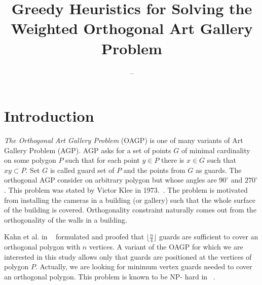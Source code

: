 \documentclass[runningheads,a4paper]{llncs}
\begin{document}
    \mainmatter  %

    \title{Greedy Heuristics for Solving the Weighted Orthogonal Art Gallery Problem}

    \author{--}

    \institute{%
    }

    \maketitle


    \section{Introduction}\label{sec:introduction}
     \emph{The Orthogonal Art Gallery Problem} (OAGP) is one of many variants of Art Gallery Problem (AGP). AGP asks for a set of points $G$ of minimal cardinality on some polygon $P$ such that for each point $y \in P$ there is $x \in G$ such that $xy \subset P$.  Set $G$ is called guard set of $P$ and the points from $G$ as guards. The orthogonal AGP consider on arbitrary polygon but whose angles are $90^{\circ}$ and $270^{\circ}$. This problem was stated by Victor  Klee in 1973.~\cite{o1987art}. The problem is motivated from installing the cameras in a building (or gallery) such that the whole surface of the building is covered. Orthogonality constraint naturally comes out from the orthogonality of the walls in a building.
     
     Kahn et al. in ~\cite{kahn1983traditional} formulated and proofed that 	$\lfloor \frac{n}{4} \rfloor$ guards are  sufficient to cover an orthogonal polygon with $n$ vertices.  A variant of the OAGP for which we are interested in this study allows only that guards are positioned at the vertices of polygon $P$. Actually, we are looking for minimum vertex guards needed to cover an orthogonal polygon. This problem is known to be NP- hard in ~\cite{schuchardt1995two,katz2008guarding}.
     
\end{document}
